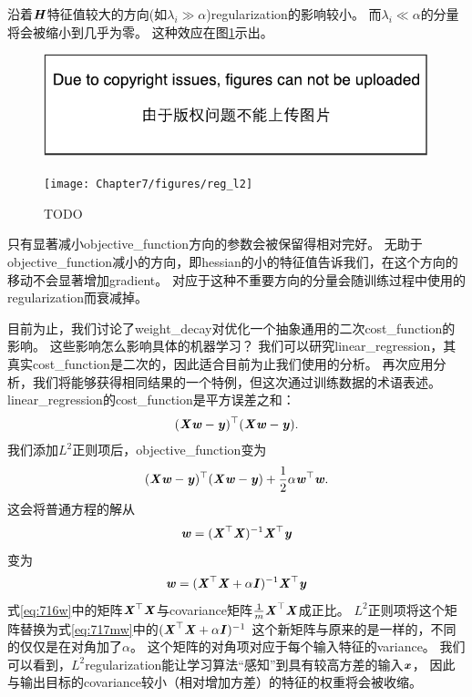 沿着$\boldsymbol{\mathit{H}}$特征值较大的方向(如$\lambda_i \gg \alpha$)\gls{regularization}的影响较小。
而$\lambda_i \ll \alpha$的分量将会被缩小到几乎为零。
这种效应在图\ref{fig:chap7_reg_l2}示出。
\begin{figure}[!htb]
\ifOpenSource
\centerline{\includegraphics{figure.pdf}}
\else
\centerline{\texttt{[image: Chapter7/figures/reg\_l2]}}
\fi
\caption{TODO}
\label{fig:chap7_reg_l2}
\end{figure}


只有显著减小\gls{objective_function}方向的参数会被保留得相对完好。
无助于\gls{objective_function}减小的方向，即\gls{hessian}的小的特征值告诉我们，在这个方向的移动不会显著增加\gls{gradient}。
对应于这种不重要方向的分量会随训练过程中使用的\gls{regularization}而衰减掉。


目前为止，我们讨论了\gls{weight_decay}对优化一个抽象通用的二次\gls{cost_function}的影响。
这些影响怎么影响具体的机器学习？
我们可以研究\gls{linear_regression}，其真实\gls{cost_function}是二次的，因此适合目前为止我们使用的分析。
再次应用分析，我们将能够获得相同结果的一个特例，但这次通过训练数据的术语表述。
\gls{linear_regression}的\gls{cost_function}是平方误差之和：
\begin{align}
 (\boldsymbol{\mathit{X}} \boldsymbol{\mathit{w}} - \boldsymbol{\mathit{y}})^\top (\boldsymbol{\mathit{X}} \boldsymbol{\mathit{w}} - \boldsymbol{\mathit{y}}).
\end{align}
我们添加$L^2$正则项后，\gls{objective_function}变为
\begin{align}
  (\boldsymbol{\mathit{X}} \boldsymbol{\mathit{w}} - \boldsymbol{\mathit{y}})^\top (\boldsymbol{\mathit{X}} \boldsymbol{\mathit{w}} - \boldsymbol{\mathit{y}}) + \frac{1}{2}\alpha \boldsymbol{\mathit{w}}^\top \boldsymbol{\mathit{w}}.
\end{align}
这会将普通方程的解从
\begin{align}
\label{eq:716w}
  \boldsymbol{\mathit{w}} = (\boldsymbol{\mathit{X}}^\top \boldsymbol{\mathit{X}})^{-1} \boldsymbol{\mathit{X}}^\top \boldsymbol{\mathit{y}}
\end{align}
变为
\begin{align}
\label{eq:717mw}
   \boldsymbol{\mathit{w}} = (\boldsymbol{\mathit{X}}^\top \boldsymbol{\mathit{X}} + \alpha \boldsymbol{\mathit{I}})^{-1} \boldsymbol{\mathit{X}}^\top \boldsymbol{\mathit{y}}
\end{align}
式\ref{eq:716w}中的矩阵$\boldsymbol{\mathit{X}}^\top\boldsymbol{\mathit{X}}$与\gls{covariance}矩阵$\frac{1}{m}\boldsymbol{\mathit{X}}^\top\boldsymbol{\mathit{X}}$成正比。
$L^2$正则项将这个矩阵替换为式\ref{eq:717mw}中的$ (\boldsymbol{\mathit{X}}^\top \boldsymbol{\mathit{X}} + \alpha \boldsymbol{\mathit{I}})^{-1}$
这个新矩阵与原来的是一样的，不同的仅仅是在对角加了$\alpha$。
这个矩阵的对角项对应于每个输入特征的\gls{variance}。
我们可以看到，$L^2$\gls{regularization}能让学习算法``感知''到具有较高方差的输入$\boldsymbol{\mathit{x}}$， 因此与输出目标的\gls{covariance}较小（相对增加方差）的特征的权重将会被收缩。

